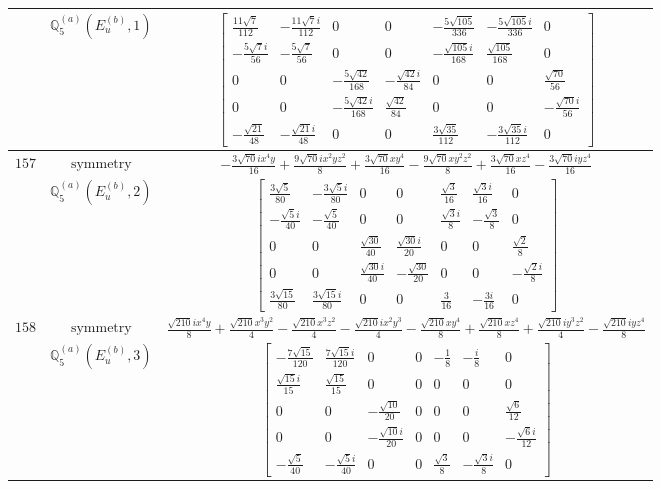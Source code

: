 \documentclass[fleqn,8pt,landscape]{jsarticle}
\begin{document}
\begin{longtable}{ccc}
$  $ & $ \mathbb{Q}_{5}^{(a)}(E_{u}^{(b)},1) $ & $ \begin{bmatrix} \frac{11 \sqrt{7}}{112} & - \frac{11 \sqrt{7} i}{112} & 0 & 0 & - \frac{5 \sqrt{105}}{336} & - \frac{5 \sqrt{105} i}{336} & 0 \\ - \frac{5 \sqrt{7} i}{56} & - \frac{5 \sqrt{7}}{56} & 0 & 0 & - \frac{\sqrt{105} i}{168} & \frac{\sqrt{105}}{168} & 0 \\ 0 & 0 & - \frac{5 \sqrt{42}}{168} & - \frac{\sqrt{42} i}{84} & 0 & 0 & \frac{\sqrt{70}}{56} \\ 0 & 0 & - \frac{5 \sqrt{42} i}{168} & \frac{\sqrt{42}}{84} & 0 & 0 & - \frac{\sqrt{70} i}{56} \\ - \frac{\sqrt{21}}{48} & - \frac{\sqrt{21} i}{48} & 0 & 0 & \frac{3 \sqrt{35}}{112} & - \frac{3 \sqrt{35} i}{112} & 0 \end{bmatrix} $ \\ \hline
$ 157 $ & $ \text{symmetry} $ & $ - \frac{3 \sqrt{70} i x^{4} y}{16} + \frac{9 \sqrt{70} i x^{2} y z^{2}}{8} + \frac{3 \sqrt{70} x y^{4}}{16} - \frac{9 \sqrt{70} x y^{2} z^{2}}{8} + \frac{3 \sqrt{70} x z^{4}}{16} - \frac{3 \sqrt{70} i y z^{4}}{16} $ \\
$  $ & $ \mathbb{Q}_{5}^{(a)}(E_{u}^{(b)},2) $ & $ \begin{bmatrix} \frac{3 \sqrt{5}}{80} & - \frac{3 \sqrt{5} i}{80} & 0 & 0 & \frac{\sqrt{3}}{16} & \frac{\sqrt{3} i}{16} & 0 \\ - \frac{\sqrt{5} i}{40} & - \frac{\sqrt{5}}{40} & 0 & 0 & \frac{\sqrt{3} i}{8} & - \frac{\sqrt{3}}{8} & 0 \\ 0 & 0 & \frac{\sqrt{30}}{40} & \frac{\sqrt{30} i}{20} & 0 & 0 & \frac{\sqrt{2}}{8} \\ 0 & 0 & \frac{\sqrt{30} i}{40} & - \frac{\sqrt{30}}{20} & 0 & 0 & - \frac{\sqrt{2} i}{8} \\ \frac{3 \sqrt{15}}{80} & \frac{3 \sqrt{15} i}{80} & 0 & 0 & \frac{3}{16} & - \frac{3 i}{16} & 0 \end{bmatrix} $ \\ \hline
$ 158 $ & $ \text{symmetry} $ & $ \frac{\sqrt{210} i x^{4} y}{8} + \frac{\sqrt{210} x^{3} y^{2}}{4} - \frac{\sqrt{210} x^{3} z^{2}}{4} - \frac{\sqrt{210} i x^{2} y^{3}}{4} - \frac{\sqrt{210} x y^{4}}{8} + \frac{\sqrt{210} x z^{4}}{8} + \frac{\sqrt{210} i y^{3} z^{2}}{4} - \frac{\sqrt{210} i y z^{4}}{8} $ \\
$  $ & $ \mathbb{Q}_{5}^{(a)}(E_{u}^{(b)},3) $ & $ \begin{bmatrix} - \frac{7 \sqrt{15}}{120} & \frac{7 \sqrt{15} i}{120} & 0 & 0 & - \frac{1}{8} & - \frac{i}{8} & 0 \\ \frac{\sqrt{15} i}{15} & \frac{\sqrt{15}}{15} & 0 & 0 & 0 & 0 & 0 \\ 0 & 0 & - \frac{\sqrt{10}}{20} & 0 & 0 & 0 & \frac{\sqrt{6}}{12} \\ 0 & 0 & - \frac{\sqrt{10} i}{20} & 0 & 0 & 0 & - \frac{\sqrt{6} i}{12} \\ - \frac{\sqrt{5}}{40} & - \frac{\sqrt{5} i}{40} & 0 & 0 & \frac{\sqrt{3}}{8} & - \frac{\sqrt{3} i}{8} & 0 \end{bmatrix} $ \\ \hline

\end{longtable}
\end{document}
